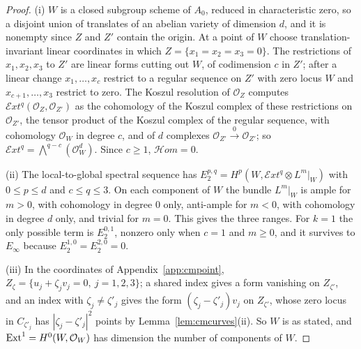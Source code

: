 \begin{proof}
(i) $W$ is a closed subgroup scheme of $A_{0}$, reduced in characteristic zero, so a disjoint union of translates of an abelian variety of dimension $d$, and it is nonempty since $Z$ and $Z'$ contain the origin. At a point of $W$ choose translation-invariant linear coordinates in which $Z=\{x_{1}=x_{2}=x_{3}=0\}$. The restrictions of $x_{1},x_{2},x_{3}$ to $Z'$ are linear forms cutting out $W$, of codimension $c$ in $Z'$; after a linear change $x_{1},\dots,x_{c}$ restrict to a regular sequence on $Z'$ with zero locus $W$ and $x_{c+1},\dots,x_{3}$ restrict to zero. The Koszul resolution of $\mathcal{O}_{Z}$ computes $\mathcal{E}xt^{q}(\mathcal{O}_{Z},\mathcal{O}_{Z'})$ as the cohomology of the Koszul complex of these restrictions on $\mathcal{O}_{Z'}$, the tensor product of the Koszul complex of the regular sequence, with cohomology $\mathcal{O}_{W}$ in degree $c$, and of $d$ complexes $\mathcal{O}_{Z'}\xrightarrow{0}\mathcal{O}_{Z'}$; so $\mathcal{E}xt^{q}=\bigwedge^{q-c}(\mathcal{O}_{W}^{d})$. Since $c\ge1$, $\mathcal{H}om=0$.

(ii) The local-to-global spectral sequence has $E_{2}^{p,q}=H^{p}(W,\mathcal{E}xt^{q}\otimes L^{m}|_{W})$ with $0\le p\le d$ and $c\le q\le3$. On each component of $W$ the bundle $L^{m}|_{W}$ is ample for $m>0$, with cohomology in degree $0$ only, anti-ample for $m<0$, with cohomology in degree $d$ only, and trivial for $m=0$. This gives the three ranges. For $k=1$ the only possible term is $E_{2}^{0,1}$, nonzero only when $c=1$ and $m\ge0$, and it survives to $E_{\infty}$ because $E_{2}^{1,0}=E_{2}^{2,0}=0$.

(iii) In the coordinates of Appendix~\ref{app:cmpoint}, $Z_{\zeta}=\{u_{j}+\zeta_{j}v_{j}=0,\ j=1,2,3\}$; a shared index gives a form vanishing on $Z_{\zeta'}$, and an index with $\zeta_{j}\ne\zeta'_{j}$ gives the form $(\zeta_{j}-\zeta'_{j})v_{j}$ on $Z_{\zeta'}$, whose zero locus in $C_{\zeta'_{j}}$ has $|\zeta_{j}-\zeta'_{j}|^{2}$ points by Lemma~\ref{lem:cmcurves}(ii). So $W$ is as stated, and $\mathrm{Ext}^{1}=H^{0}(W,\mathcal{O}_{W})$ has dimension the number of components of $W$.
\end{proof}

